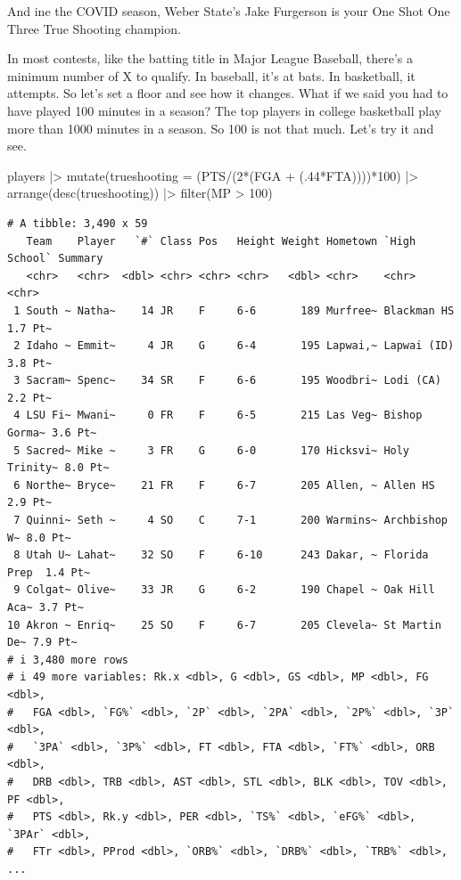 \documentclass[
  letterpaper,
  DIV=11,
  numbers=noendperiod]{scrreprt}
\newenvironment{Shaded}{\begin{snugshade}}{\end{snugshade}}
\newcommand{\AttributeTok}[1]{\textcolor[rgb]{0.40,0.45,0.13}{#1}}
\newcommand{\DecValTok}[1]{\textcolor[rgb]{0.68,0.00,0.00}{#1}}
\newcommand{\FunctionTok}[1]{\textcolor[rgb]{0.28,0.35,0.67}{#1}}
\newcommand{\NormalTok}[1]{\textcolor[rgb]{0.00,0.23,0.31}{#1}}
\newcommand{\SpecialCharTok}[1]{\textcolor[rgb]{0.37,0.37,0.37}{#1}}
\begin{document}
And ine the COVID season, Weber State's Jake Furgerson is your One Shot
One Three True Shooting champion.

In most contests, like the batting title in Major League Baseball,
there's a minimum number of X to qualify. In baseball, it's at bats. In
basketball, it attempts. So let's set a floor and see how it changes.
What if we said you had to have played 100 minutes in a season? The top
players in college basketball play more than 1000 minutes in a season.
So 100 is not that much. Let's try it and see.

\begin{Shaded}
\begin{Highlighting}[]
\NormalTok{players }\SpecialCharTok{|\textgreater{}}
  \FunctionTok{mutate}\NormalTok{(}\AttributeTok{trueshooting =}\NormalTok{ (PTS}\SpecialCharTok{/}\NormalTok{(}\DecValTok{2}\SpecialCharTok{*}\NormalTok{(FGA }\SpecialCharTok{+}\NormalTok{ (.}\DecValTok{44}\SpecialCharTok{*}\NormalTok{FTA))))}\SpecialCharTok{*}\DecValTok{100}\NormalTok{) }\SpecialCharTok{|\textgreater{}}
  \FunctionTok{arrange}\NormalTok{(}\FunctionTok{desc}\NormalTok{(trueshooting)) }\SpecialCharTok{|\textgreater{}}
  \FunctionTok{filter}\NormalTok{(MP }\SpecialCharTok{\textgreater{}} \DecValTok{100}\NormalTok{)}
\end{Highlighting}
\end{Shaded}

\begin{verbatim}
# A tibble: 3,490 x 59
   Team    Player   `#` Class Pos   Height Weight Hometown `High School` Summary
   <chr>   <chr>  <dbl> <chr> <chr> <chr>   <dbl> <chr>    <chr>         <chr>  
 1 South ~ Natha~    14 JR    F     6-6       189 Murfree~ Blackman HS   1.7 Pt~
 2 Idaho ~ Emmit~     4 JR    G     6-4       195 Lapwai,~ Lapwai (ID)   3.8 Pt~
 3 Sacram~ Spenc~    34 SR    F     6-6       195 Woodbri~ Lodi (CA)     2.2 Pt~
 4 LSU Fi~ Mwani~     0 FR    F     6-5       215 Las Veg~ Bishop Gorma~ 3.6 Pt~
 5 Sacred~ Mike ~     3 FR    G     6-0       170 Hicksvi~ Holy Trinity~ 8.0 Pt~
 6 Northe~ Bryce~    21 FR    F     6-7       205 Allen, ~ Allen HS      2.9 Pt~
 7 Quinni~ Seth ~     4 SO    C     7-1       200 Warmins~ Archbishop W~ 8.0 Pt~
 8 Utah U~ Lahat~    32 SO    F     6-10      243 Dakar, ~ Florida Prep  1.4 Pt~
 9 Colgat~ Olive~    33 JR    G     6-2       190 Chapel ~ Oak Hill Aca~ 3.7 Pt~
10 Akron ~ Enriq~    25 SO    F     6-7       205 Clevela~ St Martin De~ 7.9 Pt~
# i 3,480 more rows
# i 49 more variables: Rk.x <dbl>, G <dbl>, GS <dbl>, MP <dbl>, FG <dbl>,
#   FGA <dbl>, `FG%` <dbl>, `2P` <dbl>, `2PA` <dbl>, `2P%` <dbl>, `3P` <dbl>,
#   `3PA` <dbl>, `3P%` <dbl>, FT <dbl>, FTA <dbl>, `FT%` <dbl>, ORB <dbl>,
#   DRB <dbl>, TRB <dbl>, AST <dbl>, STL <dbl>, BLK <dbl>, TOV <dbl>, PF <dbl>,
#   PTS <dbl>, Rk.y <dbl>, PER <dbl>, `TS%` <dbl>, `eFG%` <dbl>, `3PAr` <dbl>,
#   FTr <dbl>, PProd <dbl>, `ORB%` <dbl>, `DRB%` <dbl>, `TRB%` <dbl>, ...
\end{verbatim}
\end{document}
